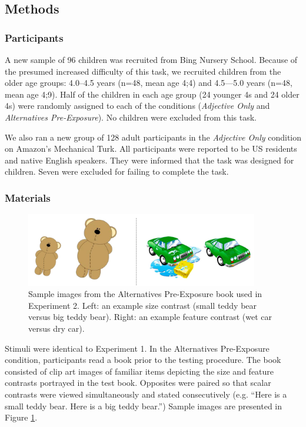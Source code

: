 \documentclass[man]{apa2}
\begin{document}
\subsection{Methods}

\subsubsection{Participants}

A new sample of 96 children was recruited from Bing Nursery School.  Because of the presumed increased difficulty of this task, we recruited children from the older age groups: 4.0--4.5 years (n=48, mean age 4;4) and 4.5---5.0 years (n=48, mean age 4;9).  Half of the children in each age group (24 younger 4s and 24 older 4s) were randomly assigned to each of the conditions (\emph{Adjective Only} and \emph{Alternatives Pre-Exposure}). No children were excluded from this task. 

We also ran a new group of 128 adult participants in the \emph{Adjective Only} condition on Amazon's Mechanical Turk.  All participants were reported to be US residents and native English speakers.  They were informed that the task was designed for children.  Seven were excluded for failing to complete the task. 

\subsubsection{Materials}

\begin{figure}[t] 
  \begin{center} 
    \includegraphics[width=4in]{figures/aliens_book_demo_mod.png} 
    \caption{\label{fig:book_demo} Sample images from the Alternatives Pre-Exposure book used in Experiment 2. Left: an example size contrast (small teddy bear versus big teddy bear). Right: an example feature contrast (wet car versus dry car). }
  \end{center} 
\end{figure}

Stimuli were identical to Experiment 1. In the Alternatives Pre-Exposure condition, participants read a book prior to the testing procedure.  The book consisted of clip art images of familiar items depicting the size and feature contrasts portrayed in the test book. Opposites were paired so that scalar contrasts were viewed simultaneously and stated consecutively (e.g. ``Here is a small teddy bear.  Here is a big teddy bear.'')  Sample images are presented in Figure \ref{fig:book_demo}.
\end{document}
